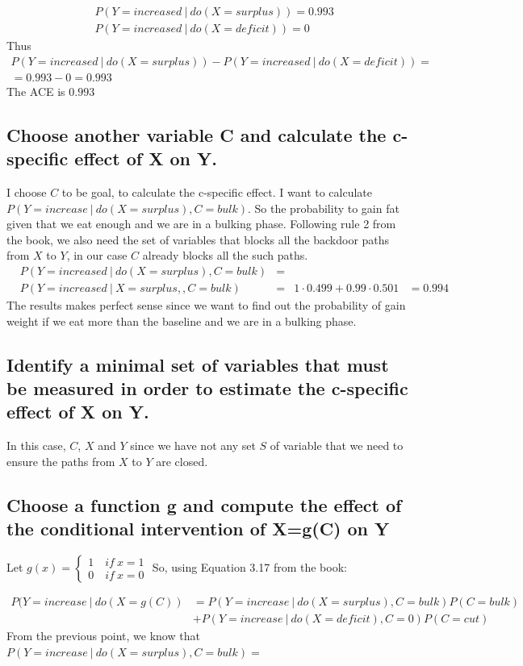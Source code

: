 \documentclass[11pt]{article}
\newcommand\given[1][]{\:#1\vert\:}
\begin{document}
\begin{align}
&P(Y=increased \given do(X=surplus)) = 0.993 \\
&P(Y=increased\given do(X=deficit)) = 0
\end{align}
Thus
\begin{align*}
P(Y=increased \given do(X=surplus)) - P(Y=increased\given do(X=deficit)) = \\
=  0.993 - 0 = 0.993
\end{align*}
The ACE is $0.993$
\subsection{Choose another variable C and calculate the c-specific effect of X on Y.}
I choose $C$ to be goal, to calculate the c-specific effect. I want to calculate $P(Y=increase \given do(X=surplus), C=bulk)$. So the probability to gain fat given that we eat enough and we are in a bulking phase. Following rule 2 from the book, we also need the set of variables that blocks all the backdoor paths from $X$ to $Y$, in our case $C$ already blocks all the such paths.
\begin{align*}
&P(Y=increased \given do(X=surplus), C=bulk) &= \\
& P(Y=increased \given X=surplus, , C=bulk) &=
& 1 \cdot 0.499 + 0.99 \cdot 0.501 &= 0.994 
\end{align*}
The results makes perfect sense since we want to find out the probability of gain weight if we eat more than the baseline and we are in a bulking phase.

\subsection{Identify a minimal set of variables that must be measured in order to estimate the c-specific effect of X on Y.}
In this case, $C$, $X$ and $Y$ since we have not any set $S$ of variable that we need to ensure the paths from $X$ to $Y$ are closed.

\subsection{Choose a function g and compute the effect of the conditional intervention of X=g(C) on Y}
Let $g(x) = 
\begin{cases} 
1 \quad if \ x = 1 \\
0 \quad if \ x =  0 
\end{cases}
$
So, using Equation 3.17 from the book:

\begin{align*}
P (Y = increase \given do(X=g(C)) &=  P(Y=increase \given do(X=surplus),C=bulk)P(C=bulk) \\
&+ P(Y= increase \given do(X=deficit),C=0)P(C=cut)
\end{align*}
From the previous point, we know that $P(Y=increase \given do(X=surplus),C=bulk) =   $
\end{document}
